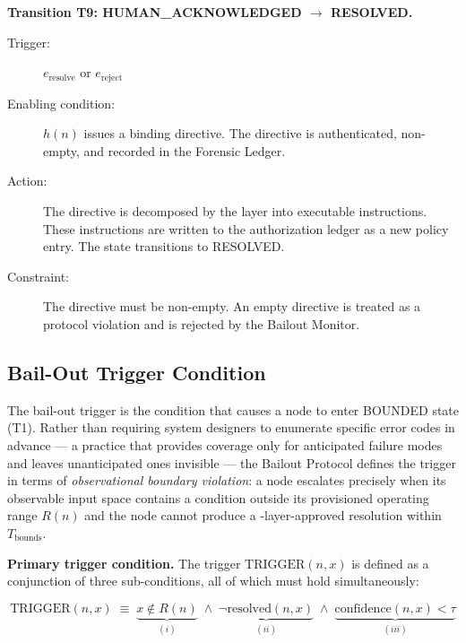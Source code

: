 \bigskip
\noindent\textbf{Transition T9: HUMAN\_ACKNOWLEDGED $\rightarrow$ RESOLVED.}

\begin{description}
\item[Trigger:] $e_{\text{resolve}}$ or $e_{\text{reject}}$
\item[Enabling condition:] $h(n)$ issues a binding directive. The directive is authenticated, non-empty, and recorded in the Forensic Ledger.
\item[Action:] The directive is decomposed by the \fact{} layer into executable instructions. These instructions are written to the authorization ledger as a new policy entry. The state transitions to RESOLVED.
\item[Constraint:] The directive must be non-empty. An empty directive is treated as a protocol violation and is rejected by the Bailout Monitor.
\end{description}

\subsection{Bail-Out Trigger Condition}\label{sec:bailout-trigger}

The bail-out trigger is the condition that causes a node to enter BOUNDED state (T1). Rather than requiring system designers to enumerate specific error codes in advance — a practice that provides coverage only for anticipated failure modes and leaves unanticipated ones invisible — the Bailout Protocol defines the trigger in terms of \emph{observational boundary violation}: a node escalates precisely when its observable input space contains a condition outside its provisioned operating range $R(n)$ and the node cannot produce a \fact-layer-approved resolution within $T_{\text{bounds}}$.

\bigskip
\noindent\textbf{Primary trigger condition.} The trigger $\text{TRIGGER}(n, x)$ is defined as a conjunction of three sub-conditions, all of which must hold simultaneously:

\begin{equation}
\text{TRIGGER}(n, x) \;\equiv\; \underbrace{x \notin R(n)}_{(i)} \;\land\; \underbrace{\neg\text{resolved}(n, x)}_{(ii)} \;\land\; \underbrace{\text{confidence}(n, x) < \tau}_{(iii)} \tag{TC}
\end{equation}

